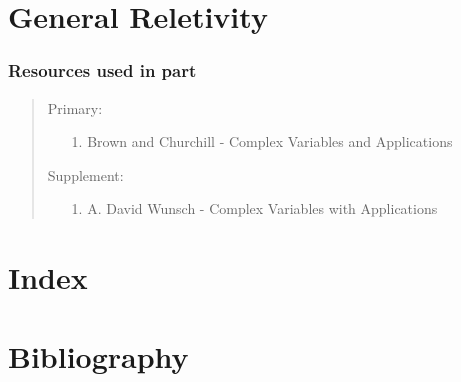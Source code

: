 \documentclass[12pt, english]{book}
\newenvironment{partintro}
{\vspace*{\fill}
	\section*{\centering Resources used in part \thepart}
	\begin{quotation}}
	{\end{quotation}\vspace*{\fill}\newpage}
\begin{document}
	\part{General Reletivity} \label{General Reletivity Part}
	\begin{partintro}
		\noindent Primary:
		\begin{itemize}
			\item[1.] Brown and Churchill - Complex Variables and Applications
		\end{itemize}
		Supplement: 
		\begin{itemize}
			\item[1.] A. David Wunsch - Complex Variables with Applications
		\end{itemize}
	\end{partintro}
	
	
	
	\backmatter
	\part{Index} \label{Index Part}
	
	\part{Bibliography}
	
	\typeout{}
	
	
\end{document}
